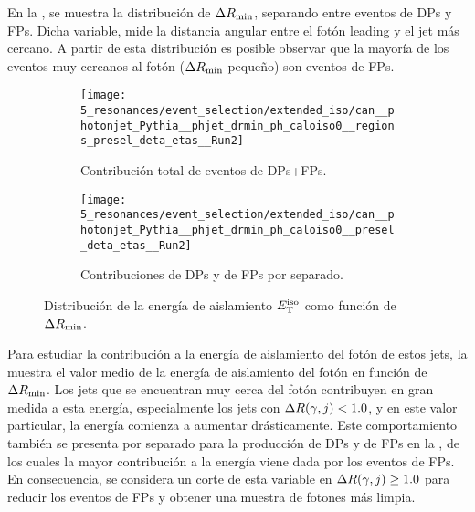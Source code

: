 En la \Fig{\ref{fig:evt_selection:sr_opt:extended_iso:phjet_drmin}}, se muestra la distribución de \(\Delta R_{\text{min}}\), separando entre eventos de \acp{DP} y \acp{FP}. Dicha variable, mide la distancia angular entre el fotón leading y el jet más cercano. A partir de esta distribución es posible observar que la mayoría de los eventos muy cercanos al fotón (\(\Delta R_{\text{min}}\) pequeño) son eventos de \acp{FP}.


\begin{figure}[ht!]
    \centering
    \begin{subfigure}[t]{0.49\linewidth}
        \centering
        \texttt{[image: 5\_resonances/event\_selection/extended\_iso/can\_\_photonjet\_Pythia\_\_phjet\_drmin\_ph\_caloiso0\_\_regions\_presel\_deta\_etas\_\_Run2]}
        \caption{Contribución total de eventos de \acp{DP}+\acp{FP}.}
        \label{fig:evt_selection:sr_opt:extended_iso:phjet_drmin:etiso:full}
    \end{subfigure}
    \hfill
    \begin{subfigure}[t]{0.49\linewidth}
        \centering
        \texttt{[image: 5\_resonances/event\_selection/extended\_iso/can\_\_photonjet\_Pythia\_\_phjet\_drmin\_ph\_caloiso0\_\_presel\_deta\_etas\_\_Run2]}
        \caption{Contribuciones de \acp{DP} y de \acp{FP} por separado.}
        \label{fig:evt_selection:sr_opt:extended_iso:phjet_drmin:etiso:separated}
    \end{subfigure}
    \caption{Distribución de la energ\'ia de aislamiento \(E_{\text{T}}^{\text{iso}}\) como función de \(\Delta R_{\text{min}}\).}
    \label{fig:evt_selection:sr_opt:extended_iso:phjet_drmin:etiso}
\end{figure}

Para estudiar la contribución a la energía de aislamiento del fotón de estos jets, la \Fig{\ref{fig:evt_selection:sr_opt:extended_iso:phjet_drmin:etiso:full}} muestra el valor medio de la energía de aislamiento del fotón en función de \(\Delta R_{\text{min}}\). Los jets que se encuentran muy cerca del fotón contribuyen en gran medida a esta energía, especialmente los jets con \(\Delta R (\gamma, j) < 1.0\), y en este valor particular, la energía comienza a aumentar drásticamente. Este comportamiento también se presenta por separado para la producción de \acp{DP} y de \acp{FP} en la \Fig{\ref{fig:evt_selection:sr_opt:extended_iso:phjet_drmin:etiso:separated}}, de los cuales la mayor contribución a la energía viene dada por los eventos de \acp{FP}.
En consecuencia, se considera un corte de esta variable en \(\Delta R (\gamma, j) \geq 1.0\) para reducir los eventos de \acp{FP} y obtener una muestra de fotones más limpia.







